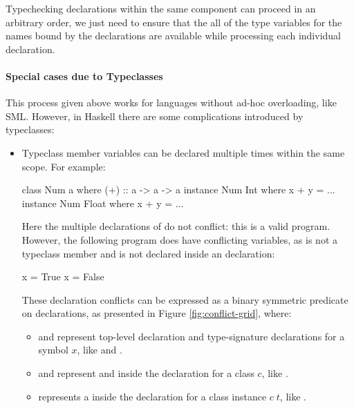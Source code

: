 \documentclass[dissertation.tex]{subfiles}
\begin{document}
{{        Typechecking declarations within the same component can proceed in an arbitrary order, we just need to ensure that the all of the type variables for the names bound by the declarations are available while processing each individual declaration.

        \paragraph*{Special cases due to Typeclasses}

        This process given above works for languages without ad-hoc overloading, like SML. However, in Haskell there are some complications introduced by typeclasses:

        \begin{itemize}
        \item
        {
            Typeclass member variables can be declared multiple times within the same scope. For example:
            
            \begin{haskellfigure}
            class Num a where
                (+) :: a -> a -> a
            instance Num Int where
                x + y = ...
            instance Num Float where
                x + y = ...
            \end{haskellfigure}

            Here the multiple declarations of \haskell{(+)} do not conflict: this is a valid program. However, the following program does have conflicting variables, as  is not a typeclass member and is not declared inside an  declaration:

            \begin{haskellfigure}
            x = True
            x = False
            \end{haskellfigure}

            These declaration conflicts can be expressed as a binary symmetric predicate on declarations, as presented in Figure \ref{fig:conflict-grid}, where:

            \begin{itemize}
            \item
            {
                 and  represent top-level declaration and type-signature declarations for a symbol \(x\), like  and .
            }
            \item
            {
                 and  represent  and  inside the declaration for a class \(c\), like .
            }
            \item
            {
                 represents a  inside the declaration for a class instance \(c\;t\), like .
            }
            \end{itemize}

}
\end{itemize}}}
\end{document}
